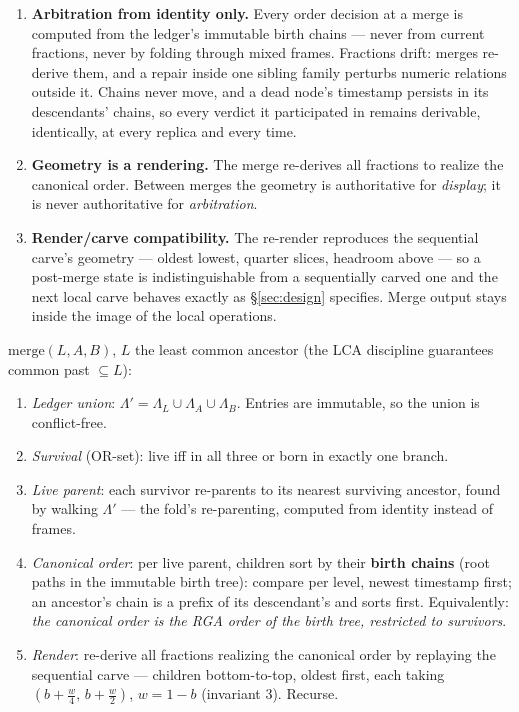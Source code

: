 \documentclass[11pt]{article}
\newcommand{\lca}{L}
\begin{document}
\begin{enumerate}
\item \textbf{Arbitration from identity only.} Every order decision at a
merge is computed from the ledger's immutable birth chains --- never from
current fractions, never by folding through mixed frames. Fractions drift:
merges re-derive them, and a repair inside one sibling family perturbs
numeric relations outside it. Chains never move, and a dead node's
timestamp persists in its descendants' chains, so every verdict it
participated in remains derivable, identically, at every replica and every
time.
\item \textbf{Geometry is a rendering.} The merge re-derives all fractions
to realize the canonical order. Between merges the geometry is
authoritative for \emph{display}; it is never authoritative for
\emph{arbitration}.
\item \textbf{Render/carve compatibility.} The re-render reproduces the
sequential carve's geometry --- oldest lowest, quarter slices, headroom
above --- so a post-merge state is indistinguishable from a sequentially
carved one and the next local carve behaves exactly as \S\ref{sec:design}
specifies. Merge output stays inside the image of the local operations.
\end{enumerate}

\noindent $\mathrm{merge}(\lca, A, B)$, $\lca$ the least common ancestor
(the LCA discipline guarantees common past $\subseteq \lca$):
\begin{enumerate}
  \item \emph{Ledger union}: $\Lambda' = \Lambda_\lca \cup \Lambda_A \cup
        \Lambda_B$. Entries are immutable, so the union is conflict-free.
  \item \emph{Survival} (OR-set): live iff in all three or born in exactly
        one branch.
  \item \emph{Live parent}: each survivor re-parents to its nearest
        surviving ancestor, found by walking $\Lambda'$ --- the fold's
        re-parenting, computed from identity instead of frames.
  \item \emph{Canonical order}: per live parent, children sort by their
        \textbf{birth chains} (root paths in the immutable birth tree):
        compare per level, newest timestamp first; an ancestor's chain is
        a prefix of its descendant's and sorts first. Equivalently:
        \emph{the canonical order is the RGA order of the birth tree,
        restricted to survivors}.
  \item \emph{Render}: re-derive all fractions realizing the canonical
        order by replaying the sequential carve --- children bottom-to-top,
        oldest first, each taking $(b + \tfrac{w}{4},\, b + \tfrac{w}{2})$,
        $w = 1 - b$ (invariant 3). Recurse.
\end{enumerate}
\end{document}

